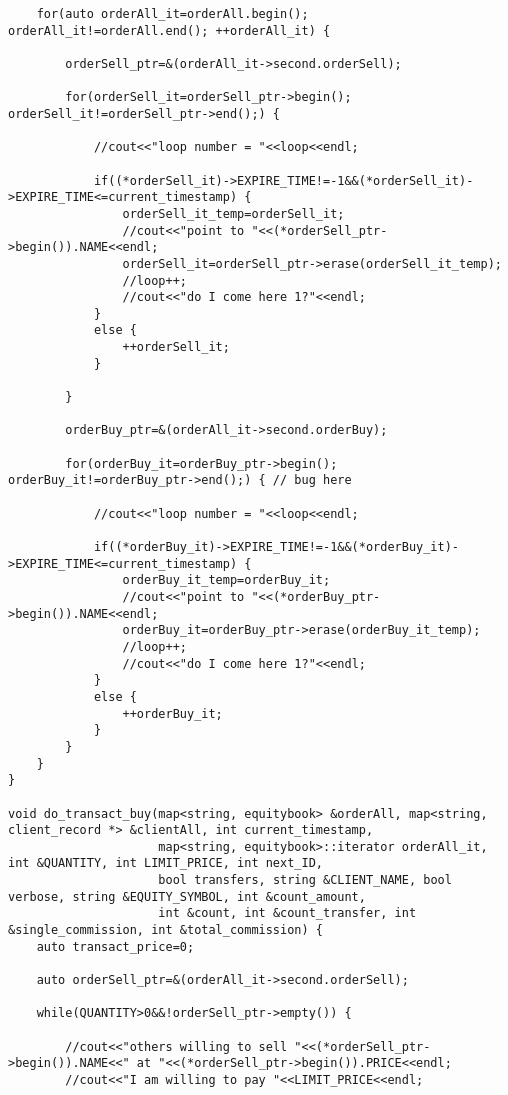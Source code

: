 \documentclass{article}
\begin{document}
\begin{spacing}{1.5}
\begin{lstlisting}
    for(auto orderAll_it=orderAll.begin(); orderAll_it!=orderAll.end(); ++orderAll_it) {

        orderSell_ptr=&(orderAll_it->second.orderSell);

        for(orderSell_it=orderSell_ptr->begin(); orderSell_it!=orderSell_ptr->end();) {

            //cout<<"loop number = "<<loop<<endl;

            if((*orderSell_it)->EXPIRE_TIME!=-1&&(*orderSell_it)->EXPIRE_TIME<=current_timestamp) {
                orderSell_it_temp=orderSell_it;
                //cout<<"point to "<<(*orderSell_ptr->begin()).NAME<<endl;
                orderSell_it=orderSell_ptr->erase(orderSell_it_temp);
                //loop++;
                //cout<<"do I come here 1?"<<endl;
            }
            else {
                ++orderSell_it;
            }

        }

        orderBuy_ptr=&(orderAll_it->second.orderBuy);

        for(orderBuy_it=orderBuy_ptr->begin(); orderBuy_it!=orderBuy_ptr->end();) { // bug here

            //cout<<"loop number = "<<loop<<endl;

            if((*orderBuy_it)->EXPIRE_TIME!=-1&&(*orderBuy_it)->EXPIRE_TIME<=current_timestamp) {
                orderBuy_it_temp=orderBuy_it;
                //cout<<"point to "<<(*orderBuy_ptr->begin()).NAME<<endl;
                orderBuy_it=orderBuy_ptr->erase(orderBuy_it_temp);
                //loop++;
                //cout<<"do I come here 1?"<<endl;
            }
            else {
                ++orderBuy_it;
            }
        }
    }
}

void do_transact_buy(map<string, equitybook> &orderAll, map<string, client_record *> &clientAll, int current_timestamp,
                     map<string, equitybook>::iterator orderAll_it, int &QUANTITY, int LIMIT_PRICE, int next_ID,
                     bool transfers, string &CLIENT_NAME, bool verbose, string &EQUITY_SYMBOL, int &count_amount,
                     int &count, int &count_transfer, int &single_commission, int &total_commission) {
    auto transact_price=0;

    auto orderSell_ptr=&(orderAll_it->second.orderSell);

    while(QUANTITY>0&&!orderSell_ptr->empty()) {

        //cout<<"others willing to sell "<<(*orderSell_ptr->begin()).NAME<<" at "<<(*orderSell_ptr->begin()).PRICE<<endl;
        //cout<<"I am willing to pay "<<LIMIT_PRICE<<endl;


\end{lstlisting}
\end{spacing}
\end{document}
